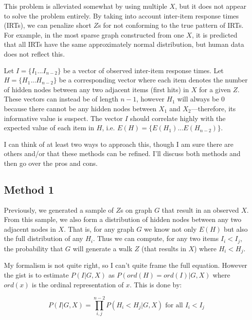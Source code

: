 \documentclass{article}
\begin{document}
\vspace{5mm}

This problem is alleviated somewhat by using multiple $X$, but it does not
appear to solve the problem entirely. By taking into account inter-item
response times (IRTs), we can penalize short $Z$s for not conforming to the
true pattern of IRTs. For example, in the most sparse graph constructed from
one $X$, it is predicted that all IRTs have the same approximately normal
distribution, but human data does not reflect this.

\vspace{5mm}

Let $I=\{I_1...I_{n-2}\}$ be a vector of observed inter-item response times.
Let $H=\{H_1...H_{n-2}\}$ be a corresponding vector where each item denotes the
number of hidden nodes between any two adjacent items (first hits) in $X$ for a
given $Z$. These vectors can instead be of length $n-1$, however $H_1$ will
always be $0$ because there cannot be any hidden nodes between $X_1$ and
$X_2$---therefore, its informative value is suspect. The vector $I$ should
correlate highly with the expected value of each item in $H$, i.e.
$E(H)=\{E(H_1)...E(H_{n-2})\}$.  

I can think of at least two ways to approach this, though I am sure there are
others and/or that these methods can be refined. I'll discuss both methods and
then go over the pros and cons.

\subsection{Method 1}
\label{sec:method1}

Previously, we generated a sample of $Z$s on graph $G$ that result in an
observed $X$. From this sample, we also form a distribution of hidden nodes
between any two adjacent nodes in $X$. That is, for any graph $G$ we know not
only $E(H)$ but also the full distribution of any $H_i$. Thus we can compute,
for any two items $I_i < I_j$, the probability that $G$ will generate a walk
$Z$ (that results in $X$) where $H_i < H_j$.

\vspace{5mm}

My formalism is not quite right, so I can't quite frame the full equation.
However the gist is to estimate $P(I|G,X)$ as $P(ord(H)=ord(I)|G,X)$ where
$ord(x)$ is the ordinal representation of $x$. This is done by:

\begin{equation}
    P(I|G,X) = \prod_{i,j}^{n-2} P(H_i<H_j|G,X) \text{ for all $I_i < I_j$} 
\end{equation}
\end{document}
